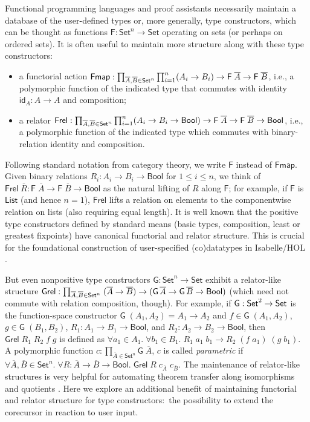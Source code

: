 \documentclass[preprint,draft]
{sigplanconf}
\newcommand\TC{\mathsf}
\newcommand{\ov}{\overline}
\newcommand{\ra}{\rightarrow}
\newcommand{\lra}{\longrightarrow}
\newcommand{\<}{\langle}
\renewcommand{\>}{\rangle}
\newcommand{\Grel}{{{\mathsf{Grel}}}}
\newcommand{\Frel}{{{\mathsf{Frel}}}}
\newcommand{\id}{\mathsf{{id}}}
\newcommand{\F}{{\TC{F}}}
\newcommand{\G}{{\TC{G}}}
\newcommand{\Fmap}{\mathsf{{Fmap}}}
\newcommand\Set{\TC{Set}}
\newcommand{\Bool}{{\TC{Bool}}}
\newcommand{\List}{{\TC{List}}}
\begin{document}
Functional programming languages and proof assistants
necessarily maintain a database of the user-defined
types or, more generally, type constructors, which
can be thought as functions $\F : \Set^n \ra \Set$ operating on sets (or perhaps on ordered sets).
It is often useful to maintain more structure along with these type constructors:
\begin{itemize}
\item a functorial action $\Fmap : \smash{\prod_{\ov{A},\ov{B} \in \Set^n} \prod_{i = 1}^n (A_i \ra\nobreak B_i)} \ra\allowbreak \F\;\ov{A} \ra \F\;\ov{B}$, i.e., a polymorphic function
of the indicated type that commutes with identity $\id_A : A \ra A$ and composition;
\item a relator $\Frel : \smash{\prod_{\ov{A},\ov{B} \in \Set^n} \prod_{i = 1}^n (A_i \ra B_i \ra \Bool)} \ra \F\;\ov{A} \ra \F\;\ov{B} \ra \Bool$, i.e.,
a polymorphic function of the indicated type which commutes with binary-relation identity and composition.
\end{itemize}
Following standard notation from category theory, we write $\F$ instead of $\Fmap$.
Given binary relations $R_i : A_i \ra B_i \ra \Bool$ for $1\leq i \leq n$, we
think of $\Frel\;\ov{R} : \F\;\ov{A} \ra \F\;\ov{B} \ra \Bool$ as the natural
lifting of $R$ along $\F$; for example, if $\F$ is $\List$ (and hence $n = 1$),
$\Frel$ lifts a relation on elements to the componentwise relation on lists (also requiring equal length). It is well known that the positive type constructors defined by standard means (basic types, composition, least or greatest fixpoints)
have canonical functorial and relator structure. This is crucial
for the foundational construction of user-specified (co)datatypes in Isabelle\slash HOL  \cite{traytel-et-al-2012}.

But even nonpositive type constructors $\G : \Set^n \ra \Set$
exhibit a relator-like structure $\Grel : \smash{\prod_{\ov{A},\ov{B} \in \Set^n}} \;(\ov{A} \ra \ov{B}) \ra (\G\,\ov{A} \ra \G\,\ov{B} \ra \Bool)$ (which
need not commute with relation composition, though).
For example, if $\G : \smash{\Set^2} \ra \Set$ is the function-space constructor $\G\;(A_1,A_2) = A_1 \ra A_2$ and
$f \in \G\;(A_1,A_2)$, $g \in \G\;(B_1,B_2)$,
$R_1 : A_1 \ra B_1 \ra \Bool$, and $R_2 : A_2 \ra B_2 \ra \Bool$,
then $\Grel\;R_1\;R_2\;f\;g$ is defined as $\forall a_1 \in A_1.\; \forall b_1 \in B_1.\;R_1\;a_1\;b_1 \lra R_2\;(f\;a_1)\;(g\;b_1)$.
A polymorphic function $c : \prod_{\ov{A} \in \Set^n} \G\;\ov{A}$, $c$ is called {\em parametric} \cite{rey-param,wadler-89}
if $\forall \ov{A},\ov{B} \in \Set^n.\;\forall R : \ov{A} \ra \ov{B} \ra \Bool.\;\Grel\;R\;c_{\ov{A}}\;c_{\ov{B}}$.
The maintenance of relator-like structures is very helpful for automating theorem transfer along isomorphisms and quotients
\cite{huffman-lifting}.
Here we explore an additional benefit of maintaining functorial and relator structure for type constructors:\
the possibility to extend the corecursor in reaction to user input.
\end{document}
